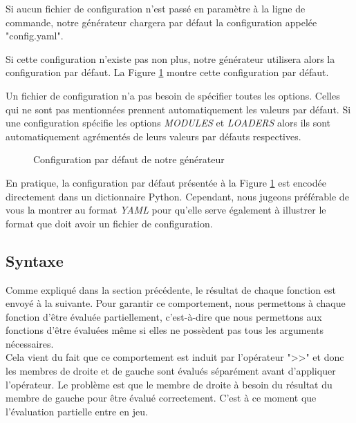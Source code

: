 		Si aucun fichier de configuration n'est passé en paramètre à la ligne de commande, notre générateur chargera par défaut la configuration appelée "config.yaml".
		
		Si cette configuration n'existe pas non plus, notre générateur utilisera alors la configuration par défaut. La Figure \ref{fig:config:default} montre cette configuration par défaut.
		
		Un fichier de configuration n'a pas besoin de spécifier toutes les options. Celles qui ne sont pas mentionnées prennent automatiquement les valeurs par défaut.	Si une configuration spécifie les options \textit{MODULES} et \textit{LOADERS} alors ils sont automatiquement agrémentés de leurs valeurs par défauts respectives.
		
		\begin{figure}[h]
			\centering
			
			\caption{Configuration par défaut de notre générateur}
			\label{fig:config:default}
		\end{figure}
		
		\newpage
		
		\begin{note}
			En pratique, la configuration par défaut présentée à la Figure \ref{fig:config:default} est encodée directement dans un dictionnaire Python. Cependant, nous jugeons préférable de vous la montrer au format \textit{YAML} pour qu'elle serve également à illustrer le format que doit avoir un fichier de configuration.
		\end{note}
		
	\subsection{Syntaxe}
	
		Comme expliqué dans la section précédente, le résultat de chaque fonction est envoyé à la suivante. Pour garantir ce comportement, nous permettons à chaque fonction d'être évaluée partiellement, c'est-à-dire que nous permettons aux fonctions d'être évaluées même si elles ne possèdent pas tous les arguments nécessaires.\\
		
		Cela vient du fait que ce comportement est induit par l'opérateur ">>" et donc les membres de droite et de gauche sont évalués séparément avant d'appliquer l'opérateur. Le problème est que le membre de droite à besoin du résultat du membre de gauche pour être évalué correctement. C'est à ce moment que l'évaluation partielle entre en jeu.\\
		
